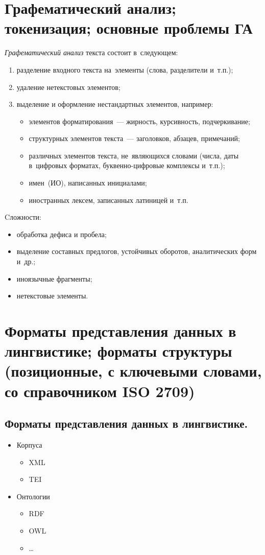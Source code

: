 \documentclass[12pt]{article}
\theoremstyle{definition}
\theoremstyle{remark}
\numberwithin{equation}{section}
\begin{document}
\section{Графематический анализ; токенизация; основные проблемы ГА}
\textsl{Графематический анализ} текста состоит в~следующем:
\begin{enumerate}
    \item разделение входного текста на~элементы (слова,
    разделители и~т.п.);
    \item удаление нетекстовых элементов;
    \item выделение и оформление нестандартных элементов, например:
    \begin{itemize}
        \item элементов форматирования~--- жирность, курсивность,
        подчеркивание;
        \item структурных элементов текста~--- заголовков, абзацев,
        примечаний;
        \item различных элементов текста, не~являющихся словами
        (числа, даты в~цифровых форматах, буквенно-цифровые комплексы
        и~т.п.);
        \item имен~(ИО), написанных инициалами;
        \item иностранных лексем, записанных латиницей и~т.п.
    \end{itemize}
\end{enumerate}

Cложности:
\begin{itemize}
    \item обработка дефиса и пробела;
    \item выделение составных предлогов, устойчивых оборотов, аналитических форм и~др.;
    \item иноязычные фрагменты;
    \item нетекстовые элементы.
\end{itemize}

\section{Форматы представления данных в лингвистике; форматы структуры (позиционные, с ключевыми словами, со справочником ISO 2709)}
\subsection{Форматы представления данных в лингвистике.}
\begin{itemize}
    \item Корпуса
    \begin{itemize}
        \item XML
        \item TEI
    \end{itemize}
    \item Онтологии
    \begin{itemize}
        \item RDF
        \item OWL
        \item \dots
    \end{itemize}
\end{itemize}
\end{document}
